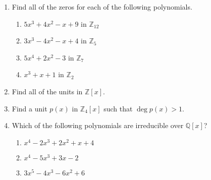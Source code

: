 {\begin{enumerate}
\begin{enumerate}
 \item
$p(x) = 7x^3 + 6x^2 - 8x + 4$ and $q(x) = x^3 + x - 2$, where $p(x), q(x) \in {\mathbb Q}[x]$  
 
 \item
$p(x) = x^3 + x^2 - x + 1$ and $q(x) = x^3 + x - 1$, where $p(x), q(x) \in {\mathbb Z}_2[x]$
 
 \item
$p(x) = x^3 + x^2 - 4x + 4$ and $q(x) = x^3 + 3 x -2$, where $p(x), q(x) \in {\mathbb Z}_5[x]$
 
 \item
$p(x) = x^3 - 2 x + 4$ and $q(x) = 4 x^3 + x + 3$, where $p(x), q(x) \in {\mathbb Q}[x]$ 
 
\end{enumerate}

\item
Find all of the zeros for each of the following polynomials.
\begin{multicols}{2}
\begin{enumerate}

\item 
$5x^3 + 4x^2 - x + 9$ in ${\mathbb Z}_{12}$

\item 
$3x^3 - 4x^2 - x + 4$ in ${\mathbb Z}_{5}$

\item 
$5x^4 + 2x^2 - 3$ in ${\mathbb Z}_{7}$

\item 
$x^3 + x + 1$ in ${\mathbb Z}_2$

\end{enumerate}
\end{multicols}
 
\item
Find all of the units in ${\mathbb Z}[x]$.

\item
Find a unit $p(x)$ in ${\mathbb Z}_4[x]$ such that $\deg p(x) > 1$.

\item
Which of the following polynomials are irreducible over ${\mathbb Q}[x]$?
\begin{multicols}{2}
\begin{enumerate}

\item 
$x^4 - 2 x^3 + 2x^2 + x + 4$

\item 
$x^4 - 5x^3 + 3x -2$

\item 
$3 x^5 - 4 x^3 - 6 x^2 + 6$


\end{enumerate}
\end{multicols}
\end{enumerate}}

